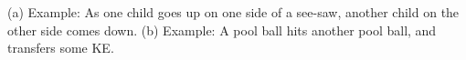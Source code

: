 (a) Example: As one child goes up on one side of a
see-saw, another child on the other side comes down. (b)
Example: A pool ball hits another pool ball, and transfers some KE.



